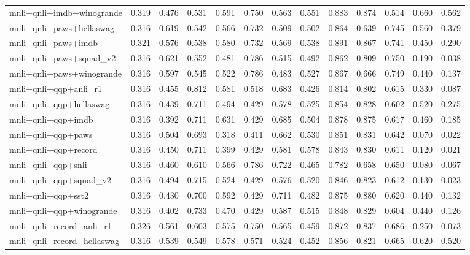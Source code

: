 \begin{table}[t]
\begin{tabular}{lrrrrrrrrrrrr}
    mnli+qnli+imdb+winogrande & 0.319 & 0.476 & 0.531 & 0.591 & 0.750 & 0.563 & 0.551 & 0.883 & 0.874 & 0.514 & 0.660 & 0.562 \\
    mnli+qnli+paws+hellaswag & 0.316 & 0.619 & 0.542 & 0.566 & 0.732 & 0.509 & 0.502 & 0.864 & 0.639 & 0.745 & 0.560 & 0.379 \\
    mnli+qnli+paws+imdb & 0.321 & 0.576 & 0.538 & 0.580 & 0.732 & 0.569 & 0.538 & 0.891 & 0.867 & 0.741 & 0.450 & 0.290 \\
    mnli+qnli+paws+squad\_v2 & 0.316 & 0.621 & 0.552 & 0.481 & 0.786 & 0.515 & 0.492 & 0.862 & 0.809 & 0.750 & 0.190 & 0.038 \\
    mnli+qnli+paws+winogrande & 0.316 & 0.597 & 0.545 & 0.522 & 0.786 & 0.483 & 0.527 & 0.867 & 0.666 & 0.749 & 0.440 & 0.137 \\
    mnli+qnli+qqp+anli\_r1 & 0.316 & 0.455 & 0.812 & 0.581 & 0.518 & 0.683 & 0.426 & 0.814 & 0.802 & 0.615 & 0.330 & 0.087 \\
    mnli+qnli+qqp+hellaswag & 0.316 & 0.439 & 0.711 & 0.494 & 0.429 & 0.578 & 0.525 & 0.854 & 0.828 & 0.602 & 0.520 & 0.275 \\
    mnli+qnli+qqp+imdb & 0.316 & 0.392 & 0.711 & 0.631 & 0.429 & 0.685 & 0.504 & 0.878 & 0.875 & 0.617 & 0.460 & 0.185 \\
    mnli+qnli+qqp+paws & 0.316 & 0.504 & 0.693 & 0.318 & 0.411 & 0.662 & 0.530 & 0.851 & 0.831 & 0.642 & 0.070 & 0.022 \\
    mnli+qnli+qqp+record & 0.316 & 0.450 & 0.711 & 0.399 & 0.429 & 0.581 & 0.578 & 0.843 & 0.830 & 0.611 & 0.120 & 0.021 \\
    mnli+qnli+qqp+snli & 0.316 & 0.460 & 0.610 & 0.566 & 0.786 & 0.722 & 0.465 & 0.782 & 0.658 & 0.650 & 0.080 & 0.067 \\
    mnli+qnli+qqp+squad\_v2 & 0.316 & 0.494 & 0.715 & 0.524 & 0.429 & 0.576 & 0.520 & 0.846 & 0.823 & 0.612 & 0.130 & 0.023 \\
    mnli+qnli+qqp+sst2 & 0.316 & 0.430 & 0.700 & 0.592 & 0.429 & 0.711 & 0.482 & 0.875 & 0.880 & 0.620 & 0.440 & 0.132 \\
    mnli+qnli+qqp+winogrande & 0.316 & 0.402 & 0.733 & 0.470 & 0.429 & 0.587 & 0.515 & 0.848 & 0.829 & 0.604 & 0.440 & 0.126 \\
    mnli+qnli+record+anli\_r1 & 0.326 & 0.561 & 0.603 & 0.575 & 0.750 & 0.565 & 0.459 & 0.872 & 0.837 & 0.686 & 0.250 & 0.073 \\
    mnli+qnli+record+hellaswag & 0.316 & 0.539 & 0.549 & 0.578 & 0.571 & 0.524 & 0.452 & 0.856 & 0.821 & 0.665 & 0.620 & 0.520 \\

\end{tabular}
\end{table}
